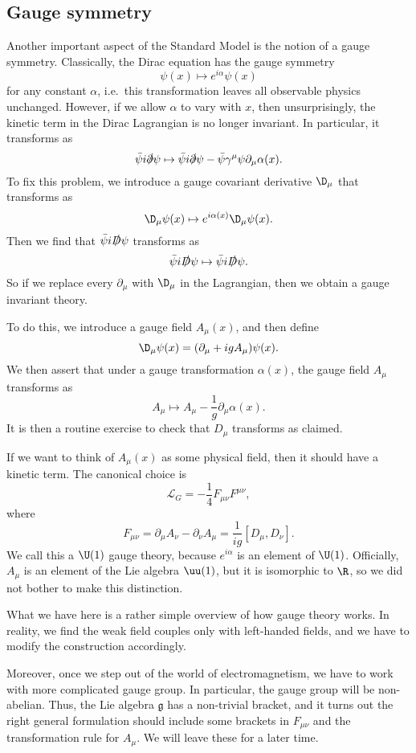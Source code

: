 \documentclass[a4paper]{article}
\begin{document}
\subsection{Gauge symmetry}
Another important aspect of the Standard Model is the notion of a gauge symmetry. Classically, the Dirac equation has the gauge symmetry
\[
  \psi(x) \mapsto e^{i\alpha}\psi(x)
\]
for any constant $\alpha$, i.e.\, this transformation leaves all observable physics unchanged. However, if we allow $\alpha$ to vary with $x$, then unsurprisingly, the kinetic term in the Dirac Lagrangian is no longer invariant. In particular, it transforms as
\[
  \bar\psi i \slashed\partial \psi \mapsto \bar\psi i \slashed\partial \psi - \bar\psi \gamma^\mu \psi \partial_\mu \alpha (x).
\]
To fix this problem, we introduce a gauge covariant derivative $\D_\mu$ that transforms as
\[
  \D_\mu \psi(x) \mapsto e^{i\alpha (x)} \D_\mu \psi(x).
\]
Then we find that $\bar\psi i \slashed D \psi$ transforms as
\[
  \bar\psi i \slashed D \psi \mapsto \bar\psi i \slashed D \psi.
\]
So if we replace every $\partial_\mu$ with $\D_\mu$ in the Lagrangian, then we obtain a gauge invariant theory.

To do this, we introduce a gauge field $A_\mu(x)$, and then define
\[
  \D_\mu \psi(x) = (\partial_\mu + i g A_\mu) \psi(x).
\]
We then assert that under a gauge transformation $\alpha(x)$, the gauge field $A_\mu$ transforms as
\[
  A_\mu \mapsto A_\mu - \frac{1}{g} \partial_\mu \alpha(x).
\]
It is then a routine exercise to check that $D_\mu$ transforms as claimed.

If we want to think of $A_\mu(x)$ as some physical field, then it should have a kinetic term. The canonical choice is
\[
  \mathcal{L}_G = -\frac{1}{4} F_{\mu\nu} F^{\mu\nu},
\]
where
\[
  F_{\mu\nu} = \partial_\mu A_\nu - \partial_\nu A_\mu = \frac{1}{ig} [D_\mu, D_\nu].
\]
We call this a $\U(1)$ gauge theory, because $e^{i\alpha}$ is an element of $\U(1)$. Officially, $A_\mu$ is an element of the Lie algebra $\uu(1)$, but it is isomorphic to $\R$, so we did not bother to make this distinction.

What we have here is a rather simple overview of how gauge theory works. In reality, we find the weak field couples only with left-handed fields, and we have to modify the construction accordingly.

Moreover, once we step out of the world of electromagnetism, we have to work with more complicated gauge group. In particular, the gauge group will be non-abelian. Thus, the Lie algebra $\mathfrak{g}$ has a non-trivial bracket, and it turns out the right general formulation should include some brackets in $F_{\mu\nu}$ and the transformation rule for $A_\mu$. We will leave these for a later time.
\end{document}
